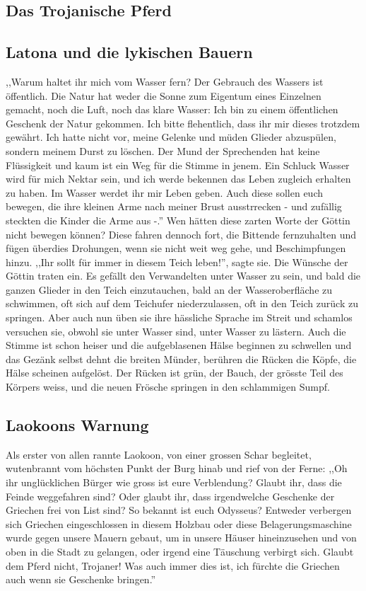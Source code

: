 \documentclass[a4paper]{article}
\begin{document}
\subsection{Das Trojanische Pferd}

\subsection{Latona und die lykischen Bauern}
,,Warum haltet ihr mich vom Wasser fern? Der Gebrauch des Wassers ist öffentlich. Die Natur hat weder die Sonne zum Eigentum eines Einzelnen gemacht, noch die Luft, noch das klare Wasser: Ich bin zu einem öffentlichen Geschenk der Natur gekommen. Ich bitte flehentlich, dass ihr mir dieses trotzdem gewährt. Ich hatte nicht vor, meine Gelenke und müden Glieder abzuspülen, sondern meinem Durst zu löschen. Der Mund der Sprechenden hat keine Flüssigkeit und kaum ist ein Weg für die Stimme in jenem. Ein Schluck Wasser wird für mich Nektar sein, und ich werde bekennen das Leben zugleich erhalten zu haben. Im Wasser werdet ihr mir Leben geben. Auch diese sollen euch bewegen, die ihre kleinen Arme nach meiner Brust ausstrrecken - und zufällig steckten die Kinder die Arme aus -.'' Wen hätten diese zarten Worte der Göttin nicht bewegen können? Diese fahren dennoch fort, die Bittende fernzuhalten und fügen überdies Drohungen, wenn sie nicht weit weg gehe, und Beschimpfungen hinzu. ,,Ihr sollt für immer in diesem Teich leben!'', sagte sie. Die Wünsche der Göttin traten ein. Es gefällt den Verwandelten unter Wasser zu sein, und bald die ganzen Glieder in den Teich einzutauchen, bald an der Wasseroberfläche zu schwimmen, oft sich auf dem Teichufer niederzulassen, oft in den Teich zurück zu springen. Aber auch nun üben sie ihre hässliche Sprache im Streit und schamlos versuchen sie, obwohl sie unter Wasser sind, unter Wasser zu lästern. Auch die Stimme ist schon heiser und die aufgeblasenen Hälse beginnen zu schwellen und das Gezänk selbst dehnt die breiten Münder, berühren die Rücken die Köpfe, die Hälse scheinen aufgelöst. Der Rücken ist grün, der Bauch, der grösste Teil des Körpers weiss, und die neuen Frösche springen in den schlammigen Sumpf.

\subsection{Laokoons Warnung}
Als erster von allen rannte Laokoon, von einer grossen Schar begleitet, wutenbrannt vom höchsten Punkt der Burg hinab und rief von der Ferne: ,,Oh ihr unglücklichen Bürger wie gross ist eure Verblendung? Glaubt ihr, dass die Feinde weggefahren sind? Oder glaubt ihr, dass irgendwelche Geschenke der Griechen frei von List sind? So bekannt ist euch Odysseus? Entweder verbergen sich Griechen eingeschlossen in diesem Holzbau oder diese Belagerungsmaschine wurde gegen unsere Mauern gebaut, um in unsere Häuser hineinzusehen und von oben in die Stadt zu gelangen, oder irgend eine Täuschung verbirgt sich. Glaubt dem Pferd nicht, Trojaner! Was auch immer dies ist, ich fürchte die Griechen auch wenn sie Geschenke bringen.''
\end{document}
